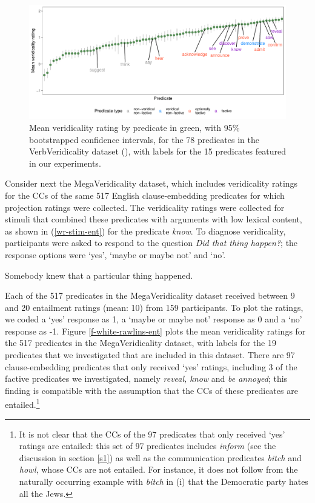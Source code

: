 \documentclass[11pt,fleqn]{article}
\newcommand{\6}{\mbox{$[\hspace*{-.6mm}[$}}
\newcommand{\9}{\mbox{$]\hspace*{-.6mm}]$}}
\begin{document}
{\begin{figure}[H]
\centering
\includegraphics[width=.77\paperwidth]{../../VerbVeridicality-analysis/graphs/means-entailment-by-predicate}

\caption{Mean veridicality rating by predicate in green, with 95\% bootstrapped confidence intervals, for the 78 predicates in the VerbVeridicality dataset (\citealt{ross-pavlick2019}), with labels for the 15 predicates featured in our experiments.}
\label{f-vv-projectivity}
\end{figure}

Consider next the MegaVeridicality dataset, which includes veridicality ratings for the CCs of the same 517 English clause-embedding predicates for which projection ratings were collected. The veridicality ratings were collected for stimuli that combined these predicates with arguments with low lexical content, as shown in (\ref{wr-stim-ent}) for the predicate {\em know}. To diagnose veridicality, participants were asked to respond to the question {\em Did that thing happen?}; the response options were `yes', `maybe or maybe not' and `no'. 

\begin{exe}
\ex\label{wr-stim-ent} Somebody knew that a particular thing happened.
\end{exe}

Each of the 517 predicates in the MegaVeridicality dataset received between 9 and 20 entailment ratings (mean: 10) from 159 participants. To plot the ratings, we coded a `yes' response as 1, a `maybe or maybe not' response as 0 and a `no' response as -1. Figure \ref{f-white-rawlins-ent} plots the mean veridicality ratings for the 517 predicates in the MegaVeridicality dataset, with labels for the 19 predicates that we investigated that are included in this dataset. There are 97 clause-embedding predicates that only received `yes' ratings, including 3 of the factive predicates we investigated, namely {\em reveal, know} and {\em be annoyed}; this finding is compatible with the assumption that the CCs of these predicates are entailed.\footnote{\label{mv}It is not clear that the CCs of the 97 predicates that only received `yes' ratings are entailed: this set of 97 predicates includes {\em inform} (see the discussion in section \ref{s1}) as well as the communication predicates {\em bitch} and {\em howl}, whose CCs are not entailed. For instance, it does not follow from the naturally occurring example with {\em bitch} in (i) that the Democratic party hates all the Jews.

}}
\end{document}
